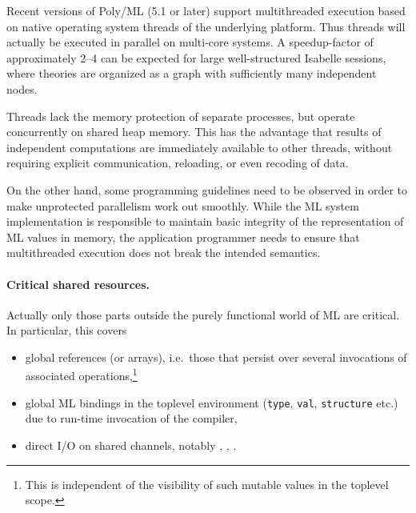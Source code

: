 \begin{isabellebody}
\begin{isamarkuptext}
\begin{description}
  \end{description}%
\end{isamarkuptext}%
\isamarkuptrue%
%
\isamarkuptrue%
%
\begin{isamarkuptext}%
Recent versions of Poly/ML (5.1 or later) support multithreaded
  execution based on native operating system threads of the
  underlying platform.  Thus threads will actually be executed in
  parallel on multi-core systems.  A speedup-factor of approximately
  2--4 can be expected for large well-structured Isabelle sessions,
  where theories are organized as a graph with sufficiently many
  independent nodes.

  Threads lack the memory protection of separate processes, but
  operate concurrently on shared heap memory.  This has the advantage
  that results of independent computations are immediately available
  to other threads, without requiring explicit communication,
  reloading, or even recoding of data.

  On the other hand, some programming guidelines need to be observed
  in order to make unprotected parallelism work out smoothly.  While
  the ML system implementation is responsible to maintain basic
  integrity of the representation of ML values in memory, the
  application programmer needs to ensure that multithreaded execution
  does not break the intended semantics.

  \medskip \paragraph{Critical shared resources.} Actually only those
  parts outside the purely functional world of ML are critical.  In
  particular, this covers

  \begin{itemize}

  \item global references (or arrays), i.e.\ those that persist over
  several invocations of associated operations,\footnote{This is
  independent of the visibility of such mutable values in the toplevel
  scope.}

  \item global ML bindings in the toplevel environment (\verb|type|, \verb|val|, \verb|structure| etc.) due to
  run-time invocation of the compiler,

  \item direct I/O on shared channels, notably , , .


\end{itemize}
\end{isamarkuptext}
\end{isabellebody}
